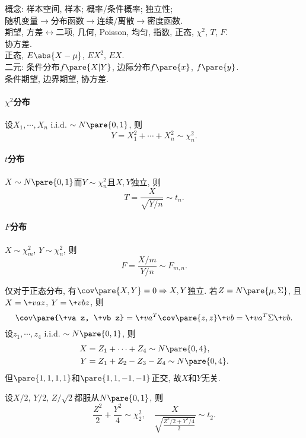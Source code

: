 \documentclass{ctexart}
\begin{document}
概念: 样本空间, 样本; 概率/条件概率; 独立性; \\
随机变量$\rightarrow$分布函数$\rightarrow$连续/离散$\rightarrow$密度函数. \\
期望, 方差$\leftrightarrow$二项, 几何, Poisson, 均匀, 指数, 正态, $\chi^2$, $T$, $F$.\\
协方差.\\
正态, $E\abs{X-\mu}$, $EX^2$, $EX$.\\
二元: 条件分布$f\pare{X\vert Y}$, 边际分布$f\pare{x}$, $f\pare{y}$.\\
条件期望, 边界期望, 协方差.\\

\paragraph{$\chi^2$分布} %
\label{par:分布}

设$X_1, \cdots, X_n$ i.i.d. $\sim N\pare{0,1}$, 则
\[ Y = X_1^2 + \cdots + X_n^2 \sim \chi_n^2. \]


\paragraph{$t$分布} %
\label{par:分布}

$X\sim N\pare{0,1}$而$Y\sim \chi_n^2$且$X,Y$独立, 则
\[ T = \frac{X}{\sqrt{Y/n}} \sim t_n. \]


\paragraph{$F$分布} %
\label{par:分布}

$X\sim \chi_m^2$, $Y\sim \chi_n^2$, 则
\[ F = \frac{X/m}{Y/n} \sim F_{m,n}. \]


\par
仅对于正态分布, 有$\cov \pare{X,Y} = 0 \Rightarrow X, Y$独立. 若$Z = N\pare{\mu,\Sigma}$, 且$X = \+va z$, $Y = \+vb z$, 则
\[ \cov\pare{\+va z, \+vb z} = \+va^T \cov\pare{z,z}\+vb = \+va^T \Sigma \+vb. \]
设$z_1, \cdots, z_4$ i.i.d. $\sim N\pare{0,1}$, 则
\begin{align*}
    X &= Z_1 + \cdots + Z_4 \sim N\pare{0,4}, \\
    Y &= Z_1 + Z_2 - Z_3 - Z_4 \sim N\pare{0,4}.
\end{align*}
但$\pare{1,1,1,1}$和$\pare{1,1,-1,-1}$正交, 故$X$和$Y$无关.
\begin{ex}
    设$X/2$, $Y/2$, $Z/\sqrt{2}$都服从$N\pare{0,1}$, 则
    \[ \frac{Z^2}{2} + \frac{Y^2}{4}\sim \chi_2^2,\quad \frac{X}{\sqrt{\frac{Z^2/2 + Y^2/4}{2}}}\sim t_{2}. \]
\end{ex}
\end{document}
